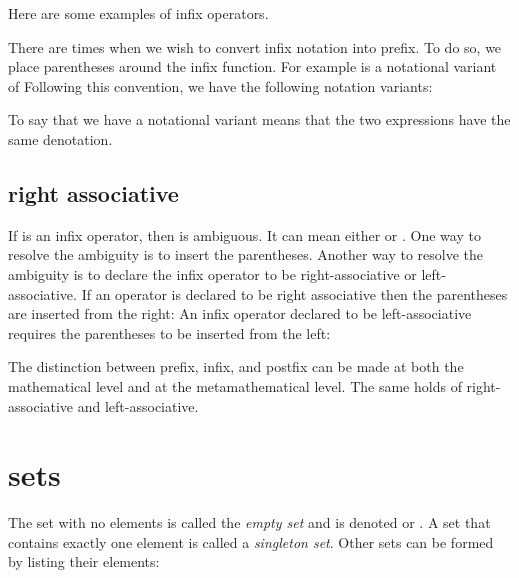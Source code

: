 Here are some examples of infix operators.

There are times when we wish to convert infix notation into prefix.  To do so, we place parentheses around the infix function.   For example
is a notational variant of
Following this convention, we have the following notation variants:

To say that we have a notational variant means that the two expressions have the same denotation.  


\subsection{right associative}

If \mc{$*$} is an infix operator, then  is ambiguous.  It can mean
either  or .  One way to resolve the ambiguity is to insert the parentheses.  Another way to resolve the ambiguity is to declare the infix operator to  be right-associative or left-associative.  If an operator is
declared to be right associative then the parentheses are inserted from the right:
An infix operator declared to be left-associative requires the parentheses to be inserted from the left:

The distinction between prefix, infix, and postfix can be made at both the mathematical level and at the metamathematical level.  The same holds of right-associative and left-associative.



\section{sets}

The set with no elements is called the {\it empty set} and is denoted \mc{$\emptyset$} or \mc{$\{\}$}.
A set  that contains exactly one element  is called a {\it singleton set}.  Other sets can be formed by listing their elements:

